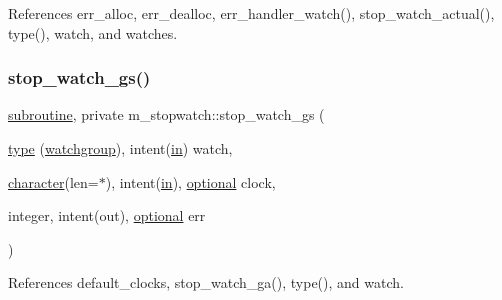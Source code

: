 References err\+\_\+alloc, err\+\_\+dealloc, err\+\_\+handler\+\_\+watch(), stop\+\_\+watch\+\_\+actual(), type(), watch, and watches.

\mbox{\label{namespacem__stopwatch_afc518d20fded06c7da4a9eba0df5e41a}} 
\subsubsection{\texorpdfstring{stop\+\_\+watch\+\_\+gs()}{stop\_watch\_gs()}}
{\footnotesize\ttfamily \hyperlink{M__stopwatch_83_8txt_acfbcff50169d691ff02d4a123ed70482}{subroutine}, private m\+\_\+stopwatch\+::stop\+\_\+watch\+\_\+gs (\begin{DoxyParamCaption}\item[{\hyperlink{stop__watch_83_8txt_a70f0ead91c32e25323c03265aa302c1c}{type} (\hyperlink{structm__stopwatch_1_1watchgroup}{watchgroup}), intent(\hyperlink{M__journal_83_8txt_afce72651d1eed785a2132bee863b2f38}{in})}]{watch,  }\item[{\hyperlink{option__stopwatch_83_8txt_abd4b21fbbd175834027b5224bfe97e66}{character}(len=$\ast$), intent(\hyperlink{M__journal_83_8txt_afce72651d1eed785a2132bee863b2f38}{in}), \hyperlink{option__stopwatch_83_8txt_aa4ece75e7acf58a4843f70fe18c3ade5}{optional}}]{clock,  }\item[{integer, intent(out), \hyperlink{option__stopwatch_83_8txt_aa4ece75e7acf58a4843f70fe18c3ade5}{optional}}]{err }\end{DoxyParamCaption})\hspace{0.3cm}{\ttfamily [private]}}



References default\+\_\+clocks, stop\+\_\+watch\+\_\+ga(), type(), and watch.

\mbox{\label{namespacem__stopwatch_a7486f3bc54b8bf0313f595151927a56c}} 
